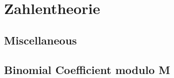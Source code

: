 \section{Zahlentheorie}

\subsection{Miscellaneous}


\subsection{Binomial Coefficient modulo M}



%




%
%
%
%
%

